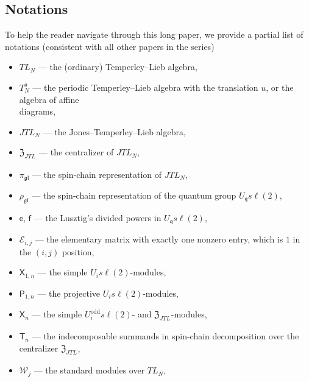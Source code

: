 \documentclass[11pt]{article}
\newcommand{\q}{\mathfrak{q}}
\newcommand{\TL}[1]{TL_{#1}}
\newcommand{\JTL}[1]{JTL_{#1}}
\newcommand{\ATL}[1]{T^a_{#1}}
\newcommand{\LQG}{U_{\q} s\ell(2)}
\newcommand{\LQGi}{U_{i} s\ell(2)}
\newcommand{\LQGoddi}{U^{\text{odd}}_{i} s\ell(2)}
\newcommand{\f}{\mathsf{f}}
\newcommand{\e}{\mathsf{e}}
\newcommand{\Egl}{\mathcal{E}}
\newcommand{\gl}{\mathfrak{gl}}
\newcommand{\repgl}{\pi_{\gl}}
\newcommand{\repQG}{\rho_{\gl}}
\newcommand{\cent}{\mathfrak{Z}}
\newcommand{\centJTL}{\cent_{\JTL{}}}
\newcommand{\Xodd}[1]{\mathsf{X}_{#1}}
\newcommand{\XX}{\mathsf{X}}
\newcommand{\PP}{\mathsf{P}}
\newcommand{\PPodd}[1]{\mathsf{T}_{#1}}
\newcommand{\StTL}[1]{\mathscr{W}_{#1}}
\theoremstyle{definition}
\begin{document}
\subsection{Notations}
To help the reader navigate through this long paper, we provide a partial list of notations (consistent with all other papers in the series)

\begin{itemize}

\item[\mbox{}]$\TL{N}$ --- the (ordinary) Temperley--Lieb algebra,

\item[\mbox{}]$\ATL{N}$ --- the periodic Temperley--Lieb algebra with the translation $u$, or the algebra of affine \\\mbox{}\qquad\quad diagrams,

\item[\mbox{}]$\JTL{N}$ --- the Jones--Temperley--Lieb algebra,

\item[\mbox{}]$\centJTL$ --- the  centralizer of $\JTL{N}$,

\item[\mbox{}]$\repgl$ --- the spin-chain representation of $\JTL{N}$,

\item[\mbox{}]$\repQG$ --- the spin-chain representation of the quantum group $\LQG$,

\item[\mbox{}]$\e$, $\f$ --- the Lusztig's divided powers in $\LQG$,

\item[\mbox{}]$\Egl_{i,j}$ --- the elementary matrix with exactly one
nonzero entry, which is $1$ in the $(i,j)$ position,

 \item[\mbox{}]$\XX_{1,n}$ ---  the simple $\LQGi$-modules,

 \item[\mbox{}]$\PP_{1,n}$ ---  the projective $\LQGi$-modules,

 \item[\mbox{}]$\Xodd{n}$ --- the simple $\LQGoddi$- and $\centJTL$-modules,

 \item[\mbox{}]$\PPodd{n}$ ---  the indecomposable summands in spin-chain decomposition over the centralizer $\centJTL$,

\item[\mbox{}]$\StTL{j}$ --- the standard modules over $\TL{N}$,


\end{itemize}
\end{document}
